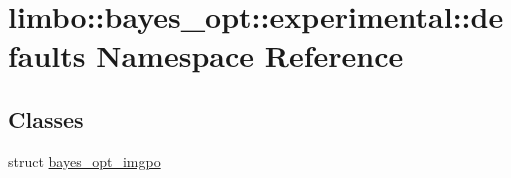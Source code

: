 \hypertarget{namespacelimbo_1_1bayes__opt_1_1experimental_1_1defaults}{}\section{limbo\+:\+:bayes\+\_\+opt\+:\+:experimental\+:\+:defaults Namespace Reference}
\label{namespacelimbo_1_1bayes__opt_1_1experimental_1_1defaults}
\subsection*{Classes}
\begin{DoxyCompactItemize}
\item 
struct \hyperlink{structlimbo_1_1bayes__opt_1_1experimental_1_1defaults_1_1bayes__opt__imgpo}{bayes\+\_\+opt\+\_\+imgpo}
\end{DoxyCompactItemize}
